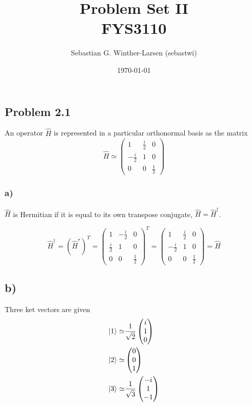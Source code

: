 \documentclass{article}
\title{Problem Set II \\
  \large{FYS3110}}
\author{Sebastian G. Winther-Larsen (sebastwi)}
\date{\today}
\newcommand*\colvec[3][]{
    \begin{pmatrix}\ifx\relax#1\relax\else#1\\\fi#2\\#3\end{pmatrix}
}
\begin{document}
\maketitle

\subsection*{Problem 2.1}

An operator $\hat{H}$ is represented in a particular orthonormal basis
as the matrix
\begin{equation}
\hat{H}\simeq
\begin{pmatrix}
1 & \frac{i}{2} & 0 \\
-\frac{i}{2} & 1 & 0 \\
0 & 0 & \frac{1}{2}
\end{pmatrix}
\end{equation}

\subsubsection*{a)}

$\hat{H}$ is Hermitian if it is equal to its own transpose conjugate,
$\hat{H}=\hat{H}^{\dagger}$.

\begin{equation}
\hat{H}^{\dagger}=(\hat{H}^*)^T=
\begin{pmatrix}
1 & -\frac{i}{2} & 0 \\
\frac{i}{2} & 1 & 0 \\
0 & 0 & \frac{1}{2}
\end{pmatrix}^T=
\begin{pmatrix}
1 & \frac{i}{2} & 0 \\
-\frac{i}{2} & 1 & 0 \\
0 & 0 & \frac{1}{2}
\end{pmatrix}=
\hat{H}
\end{equation}

\subsection*{b)}

Three ket vectors are given 
\begin{align}
\ket{1} \simeq& \frac{1}{\sqrt{2}}\colvec[i]{1}{0}  \label{ket1}\\
\ket{2} \simeq& \colvec[0]{0}{1} \label{ket2}\\
\ket{3} \simeq& \frac{1}{\sqrt{3}}\colvec[-i]{1}{-1} \label{ket3}
\end{align}
\end{document}

